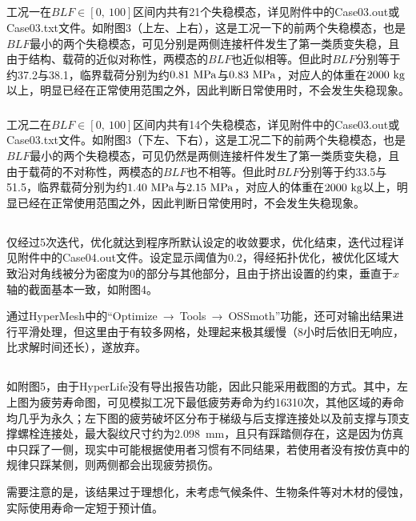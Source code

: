 \documentclass[12pt, oneside, a4paper]{ctexart}
\begin{document}
\subsection{}
\subsubsection{}
\par{}
工况一在$BLF \in [0,~100]$区间内共有21个失稳模态，详见附件中的Case03.out或Case03.txt文件。如附图3（上左、上右），这是工况一下的前两个失稳模态，也是$BLF$最小的两个失稳模态，可见分别是两侧连接杆件发生了第一类质变失稳，且由于结构、载荷的近似对称性，两模态的$BLF$也近似相等。但此时$BLF$分别等于约37.2与38.1，临界载荷分别为约$\rm 0.81~MPa$与$\rm 0.83~MPa$，对应人的体重在$\rm 2000~kg$以上，明显已经在正常使用范围之外，因此判断日常使用时，不会发生失稳现象。
\par{}
\subsubsection{}
工况二在$BLF \in [0,~100]$区间内共有14个失稳模态，详见附件中的Case03.out或Case03.txt文件。如附图3（下左、下右），这是工况二下的前两个失稳模态，也是$BLF$最小的两个失稳模态，可见仍然是两侧连接杆件发生了第一类质变失稳，且由于载荷的不对称性，两模态的$BLF$也不相等。但此时$BLF$分别等于约33.5与51.5，临界载荷分别为约$\rm 1.40~MPa$与$\rm 2.15~MPa$，对应人的体重在$\rm 2000~kg$以上，明显已经在正常使用范围之外，因此判断日常使用时，不会发生失稳现象。
\subsection{}
\par{}
仅经过5次迭代，优化就达到程序所默认设定的收敛要求，优化结束，迭代过程详见附件中的Case04.out文件。设定显示阈值为0.2，得经拓扑优化，被优化区域大致沿对角线被分为密度为0的部分与其他部分，且由于挤出设置的约束，垂直于$x$轴的截面基本一致，如附图4。
\par{}
通过HyperMesh中的“Optimize~→~Tools~→~OSSmoth”功能，还可对输出结果进行平滑处理，但这里由于有较多网格，处理起来极其缓慢（8小时后依旧无响应，比求解时间还长），遂放弃。
\subsection{}
\par{}
如附图5，由于HyperLife没有导出报告功能，因此只能采用截图的方式。其中，左上图为疲劳寿命图，可见模拟工况下最低疲劳寿命为约16310次，其他区域的寿命均几乎为永久；左下图的疲劳破坏区分布于梯级与后支撑连接处以及前支撑与顶支撑螺栓连接处，最大裂纹尺寸约为2.098~mm，且只有踩踏侧存在，这是因为仿真中只踩了一侧，现实中可能根据使用者习惯有不同结果，若使用者没有按仿真中的规律只踩某侧，则两侧都会出现疲劳损伤。
\par{}
需要注意的是，该结果过于理想化，未考虑气候条件、生物条件等对木材的侵蚀，实际使用寿命一定短于预计值。
\end{document}

